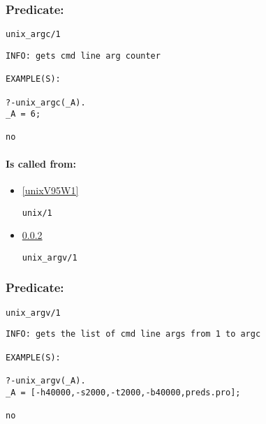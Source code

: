 \subsubsection{Predicate:} \label{unixV95WargcV95W1}

\begin{verbatim}
unix_argc/1
\end{verbatim}

{\small \begin{verbatim}
INFO: gets cmd line arg counter

EXAMPLE(S):

?-unix_argc(_A).
_A = 6;

no

\end{verbatim}}
\paragraph{Is called from:} 
\begin{itemize}
\item \ref{unixV95W1} 
\begin{verbatim}
unix/1
\end{verbatim}

\item \ref{unixV95WargvV95W1} 
\begin{verbatim}
unix_argv/1
\end{verbatim}

\end{itemize}

\subsubsection{Predicate:} \label{unixV95WargvV95W1}

\begin{verbatim}
unix_argv/1
\end{verbatim}

{\small \begin{verbatim}
INFO: gets the list of cmd line args from 1 to argc

EXAMPLE(S):

?-unix_argv(_A).
_A = [-h40000,-s2000,-t2000,-b40000,preds.pro];

no

\end{verbatim}}
